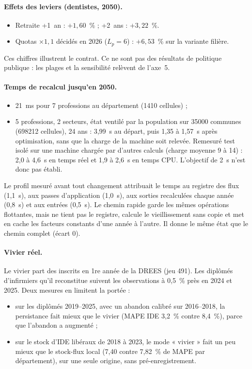 \paragraph{Effets des leviers (dentistes, 2050).}
\begin{itemize}
  \item Retraite +1~an : $+1{,}60$\mesure{}~\% ; +2~ans : $+3{,}22$\mesure{}~\%.
  \item Quotas $\times1{,}1$ décidés en 2026 ($L_p = 6$\suppose{}) : $+6{,}53$\mesure{}~\% sur la
        variante filière.
\end{itemize}
Ces chiffres illustrent le contrat. Ce ne sont pas des résultats de politique publique : les plages
et la sensibilité relèvent de l'axe~5.

\paragraph{Temps de recalcul jusqu'en 2050.}
\begin{itemize}
  \item 21\mesure{}~ms pour 7 professions au département (\num{1410} cellules) ;
  \item 5 professions, 2 secteurs, état ventilé par la population sur \num{35000} communes
        (\num{698212} cellules), 24 ans : 3,99\mesure{}~s au départ, puis 1,35 à 1,57\mesure{}~s
        après optimisation, sans que la charge de la machine soit relevée. Remesuré test isolé sur une
        machine chargée par d'autres calculs (charge moyenne 9 à 14) : 2,0 à 4,6\mesure{}~s en temps réel
        et 1,9 à 2,6\mesure{}~s en temps CPU. L'objectif de 2~s n'est donc pas établi.
\end{itemize}
Le profil mesuré avant tout changement attribuait le temps au registre des flux (1,1~s), aux passes
d'application (1,0~s), aux sorties recalculées chaque année (0,8~s) et aux entrées (0,5~s). Le chemin
rapide garde les mêmes opérations flottantes, mais ne tient pas le registre, calcule le vieillissement
sans copie et met en cache les facteurs constants d'une année à l'autre. Il donne le même état que le
chemin complet (écart 0).

\paragraph{Vivier réel.} Le vivier part des inscrits en 1re année de la DREES (jeu 491). Les diplômés
d'infirmiers qu'il reconstitue suivent les observations à 0,5~\% près en 2024 et 2025. Deux mesures en
limitent la portée :
\begin{itemize}
  \item sur les diplômés 2019--2025, avec un abandon calibré sur 2016--2018, la persistance fait mieux
        que le vivier (MAPE IDE 3,2\mesure{}~\% contre 8,4\mesure{}~\%), parce que l'abandon a
        augmenté ;
  \item sur le stock d'IDE libéraux de 2018 à 2023, le mode « vivier » fait un peu mieux que le
        stock-flux local (7,40\mesure{} contre 7,82\mesure{}~\% de MAPE par département), sur une
        seule origine, sans pré-enregistrement.
\end{itemize}

